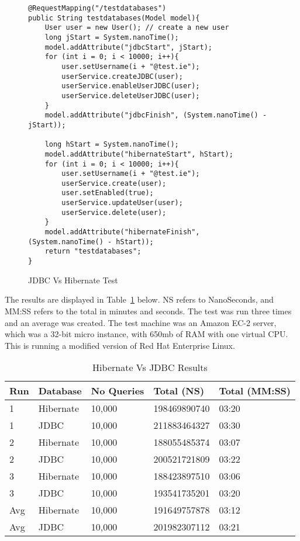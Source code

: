 \begin{figure}[H]
\begin{lstlisting}
@RequestMapping("/testdatabases")
public String testdatabases(Model model){
	User user = new User(); // create a new user
	long jStart = System.nanoTime();
	model.addAttribute("jdbcStart", jStart);
	for (int i = 0; i < 10000; i++){
		user.setUsername(i + "@test.ie");
		userService.createJDBC(user);
		userService.enableUserJDBC(user);
		userService.deleteUserJDBC(user);
	}
	model.addAttribute("jdbcFinish", (System.nanoTime() - jStart));
	
	long hStart = System.nanoTime();
	model.addAttribute("hibernateStart", hStart);
	for (int i = 0; i < 10000; i++){
		user.setUsername(i + "@test.ie");
		userService.create(user);
		user.setEnabled(true);
		userService.updateUser(user);
		userService.delete(user);
	}
	model.addAttribute("hibernateFinish", (System.nanoTime() - hStart));
	return "testdatabases";
}
\end{lstlisting}
\caption{JDBC Vs Hibernate Test}
\label{fig:jdbcvhibernate}
\end{figure}

The results are displayed in Table~\ref{fig:resulttable} below. NS refers to NanoSeconds, and MM:SS refers to the total in minutes and seconds. The test was run three times and an average was created. The test machine was an Amazon EC-2 server, which was a 32-bit micro instance, with 650mb of RAM with one virtual CPU. This is running a modified version of Red Hat Enterprise Linux.

\begin{table}[H]
\caption{Hibernate Vs JDBC Results}
\begin{center}
    \begin{tabular}{ |l | l | l | l | p{2.5cm} |}
    \hline
     Run & Database & No Queries & Total (NS) & Total (MM:SS)\\ \hline
	 1 & Hibernate & 10,000 &198469890740&03:20\\ \hline
	 1 & JDBC & 10,000 &211883464327&03:30\\ \hline
	 2 & Hibernate & 10,000 &188055485374&03:07\\ \hline
	 2 & JDBC & 10,000 &200521721809&03:22\\ \hline
	 3 & Hibernate & 10,000 &188423897510&03:06\\ \hline
	 3 & JDBC & 10,000 &193541735201&03:20\\ \hline
	Avg & Hibernate & 10,000 &191649757878 &03:12\\ \hline
	Avg & JDBC & 10,000 & 201982307112&03:21\\ \hline
    \end{tabular}
\end{center}
\label{fig:resulttable}
\end{table}

